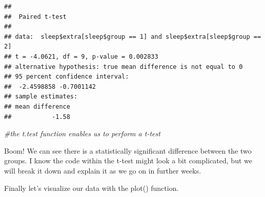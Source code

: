 \documentclass[
]{book}
\newenvironment{Shaded}{\begin{snugshade}}{\end{snugshade}}
\newcommand{\AttributeTok}[1]{\textcolor[rgb]{0.13,0.29,0.53}{#1}}
\newcommand{\CommentTok}[1]{\textcolor[rgb]{0.56,0.35,0.01}{\textit{#1}}}
\newcommand{\ConstantTok}[1]{\textcolor[rgb]{0.56,0.35,0.01}{#1}}
\newcommand{\DecValTok}[1]{\textcolor[rgb]{0.00,0.00,0.81}{#1}}
\newcommand{\FunctionTok}[1]{\textcolor[rgb]{0.13,0.29,0.53}{\textbf{#1}}}
\newcommand{\NormalTok}[1]{#1}
\newcommand{\SpecialCharTok}[1]{\textcolor[rgb]{0.81,0.36,0.00}{\textbf{#1}}}
\begin{document}
\begin{Shaded}
\end{Shaded}

\begin{verbatim}
## 
##  Paired t-test
## 
## data:  sleep$extra[sleep$group == 1] and sleep$extra[sleep$group == 2]
## t = -4.0621, df = 9, p-value = 0.002833
## alternative hypothesis: true mean difference is not equal to 0
## 95 percent confidence interval:
##  -2.4598858 -0.7001142
## sample estimates:
## mean difference 
##           -1.58
\end{verbatim}

\begin{Shaded}
\begin{Highlighting}[]
\CommentTok{\#the t.test function enables us to perform a t{-}test}
\end{Highlighting}
\end{Shaded}

Boom! We can see there is a statistically significant difference between the two groups. I know the code within the t-test might look a bit complicated, but we will break it down and explain it as we go on in further weeks.

Finally let's visualize our data with the plot() function.

\begin{Shaded}
\end{Shaded}
\end{document}
